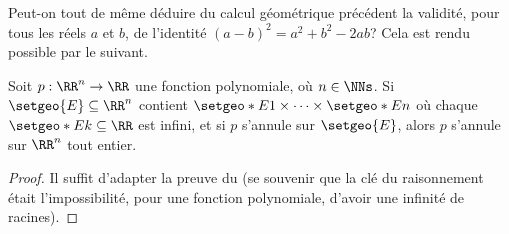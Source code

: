 Peut-on tout de même déduire du calcul géométrique précédent la validité, pour tous les réels $a$ et $b$, de l'identité $(a - b)^2 = a^2 + b^2 - 2ab$?
Cela est rendu possible par le  suivant. 


\medskip

\begin{fact} \label{poly-nullity-interval}
	Soit $p: \RR^n \rightarrow \RR$ une fonction polynomiale, où $n \in \NNs$.
	Si $\setgeo{E} \subseteq \RR^n$ contient $\setgeo*{E}{1} \times \cdots \times \setgeo*{E}{n}$ où chaque $\setgeo*{E}{k} \subseteq \RR$ est infini,
	et si $p$ s'annule sur $\setgeo{E}$,
	alors $p$ s'annule sur $\RR^n$ tout entier. 
\end{fact}


\begin{proof}
	Il suffit d'adapter la preuve du 
	(se souvenir que la clé du raisonnement était l'impossibilité, pour une fonction polynomiale, d'avoir une infinité de racines).
\end{proof}




\medskip

